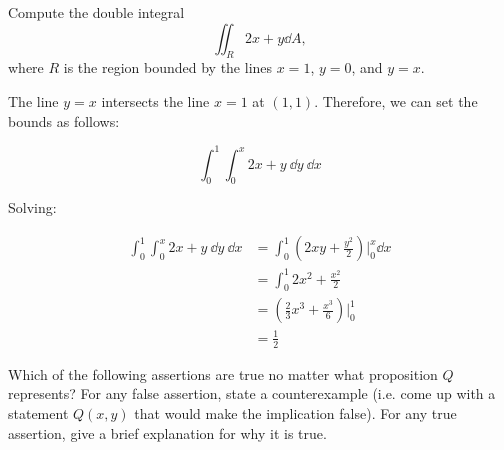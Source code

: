 \documentclass[11pt]{article}
\begin{document}
\begin{Parts}
    \Part Compute the double integral
    \[\iint_{R} 2x + y \dd{A},\]
    where $R$ is the region bounded by the lines $x = 1$, $y = 0$, and $y = x$.

    \begin{solution}
    The line $y = x$ intersects the line $x = 1$ at $(1, 1)$. Therefore, we can set the bounds as follows: 

    \[ \int_0^1\int_0^x 2x + y \ \dd y \ \dd x\]

    Solving: 

    \begin{align*}
        \int_0^1\int_0^x 2x + y \ \dd y \ \dd x &= \int_0^1 (2xy + \frac{y^2}{2})\bigg\rvert_0^x \dd x\\
        &= \int_0^1 2x^2 + \frac{x^2}{2}\\
        &= \left(\frac{2}{3}x^3 + \frac{x^3}{6}\right)\bigg\rvert_0^1\\
        &= \frac{1}{2}
    \end{align*}

    \end{solution}
\end{Parts}

Which of the following assertions are true no matter what proposition $Q$ represents? For any false assertion, state a counterexample (i.e. come up with a statement $Q(x, y)$ that would make the implication false). For any true assertion, give a brief explanation for why it is true.
\end{document}
